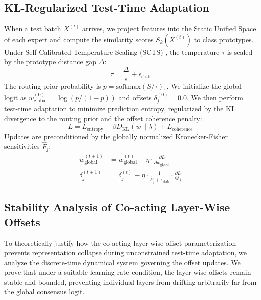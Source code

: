 \documentclass{article}
\theoremstyle{plain}
\theoremstyle{definition}
\theoremstyle{remark}
\begin{document}
\subsection{KL-Regularized Test-Time Adaptation}
When a test batch $X^{(t)}$ arrives, we project features into the Static Unified Space of each expert and compute the similarity scores $S_k(X^{(t)})$ to class prototypes. Under Self-Calibrated Temperature Scaling (SCTS) \citep{yang2025testtime}, the temperature $\tau$ is scaled by the prototype distance gap $\Delta$:
\begin{equation}
    \tau = \frac{\Delta}{s} + \epsilon_{\text{stab}}
\end{equation}
The routing prior probability is $p = \text{softmax}(S/\tau)_1$. We initialize the global logit as $w_{\text{global}}^{(0)} = \log(p / (1-p))$ and offsets $\delta_j^{(0)} = 0.0$. We then perform test-time adaptation to minimize prediction entropy, regularized by the KL divergence to the routing prior and the offset coherence penalty:
\begin{equation}
    L = L_{\text{entropy}} + \beta D_{\text{KL}}(w \| \lambda) + L_{\text{coherence}}
\end{equation}
Updates are preconditioned by the globally normalized Kronecker-Fisher sensitivities $\hat{F}_j$:
\begin{align}
    w_{\text{global}}^{(t+1)} &= w_{\text{global}}^{(t)} - \eta \cdot \frac{\partial L}{\partial w_{\text{global}}} \\
    \delta_j^{(t+1)} &= \delta_j^{(t)} - \eta \cdot \frac{1}{\hat{F}_j + \epsilon_{\text{stab}}} \cdot \frac{\partial L}{\partial \delta_j}
\end{align}

\subsection{Stability Analysis of Co-acting Layer-Wise Offsets}
To theoretically justify how the co-acting layer-wise offset parameterization prevents representation collapse during unconstrained test-time adaptation, we analyze the discrete-time dynamical system governing the offset updates. We prove that under a suitable learning rate condition, the layer-wise offsets remain stable and bounded, preventing individual layers from drifting arbitrarily far from the global consensus logit.
\end{document}
